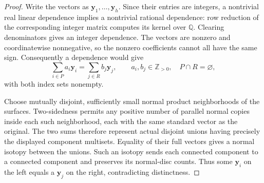 \begin{proof}
Write the vectors as $\mathbf y_1,\ldots,\mathbf y_h$. Since their entries
are integers, a nontrivial real linear dependence implies a nontrivial
rational dependence: row reduction of the corresponding integer matrix
computes its kernel over $\mathbb Q$. Clearing denominators gives an
integer dependence. The vectors are nonzero and coordinatewise
nonnegative, so the nonzero coefficients cannot all have the same sign.
Consequently a dependence would give
\[
 \sum_{i\in P}a_i\mathbf y_i
       =\sum_{j\in R}b_j\mathbf y_j,
 \qquad a_i,b_j\in\mathbb Z_{>0},\quad P\cap R=\varnothing,
\]
with both index sets nonempty.

Choose mutually disjoint, sufficiently small normal product neighborhoods
of the surfaces. Two-sidedness permits any positive number of parallel
normal copies inside each such neighborhood, each with the same standard
vector as the original. The two sums therefore represent actual disjoint
unions having precisely the displayed component multisets. Equality of
their full vectors gives a normal isotopy between the unions. Such an
isotopy sends each connected component to a connected component and
preserves its normal-disc counts. Thus some $\mathbf y_i$ on the left
equals a $\mathbf y_j$ on the right, contradicting distinctness.
\end{proof}

